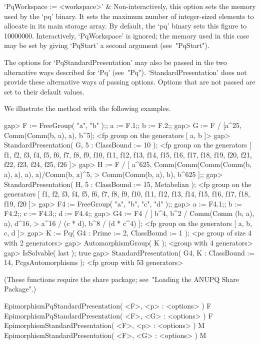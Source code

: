 `PqWorkspace := <workspace>' &
Non-interactively, this option sets the memory used by the  `pq'  binary.
It sets the maximum number of integer-sized elements to allocate  in  its
main storage array. By default, the  `pq'  binary  sets  this  figure  to
10000000. Interactively, `PqWorkspace' is ignored;  the  memory  used  in
this  case  may  be  set  by   giving   `PqStart'   a   second   argument
(see~"PqStart").

\enditems

The options for `PqStandardPresentation' may also be passed  in  the  two
alternative ways described for  `Pq'  (see~"Pq").  `StandardPresentation'
does not provide these alternative ways of passing options. Options  that
are not passed are set to their default values.

We illustrate the method with the following examples.

\beginexample
gap> F := FreeGroup( "a", "b" );; a := F.1;; b := F.2;;
gap> G := F / [a^25, Comm(Comm(b, a), a), b^5];        
<fp group on the generators [ a, b ]>
gap> StandardPresentation( G, 5 : ClassBound := 10 );  
<fp group on the generators [ f1, f2, f3, f4, f5, f6, f7, f8, f9, f10, f11, 
  f12, f13, f14, f15, f16, f17, f18, f19, f20, f21, f22, f23, f24, f25, f26 ]>
gap> H := F / [ a^625, Comm(Comm(Comm(Comm(b, a), a), a), a)/Comm(b, a)^5,
>               Comm(Comm(b, a), b), b^625 ];;                     
gap> StandardPresentation( H, 5 : ClassBound := 15, Metabelian );
<fp group on the generators [ f1, f2, f3, f4, f5, f6, f7, f8, f9, f10, f11, 
  f12, f13, f14, f15, f16, f17, f18, f19, f20 ]>
gap> F4 := FreeGroup( "a", "b", "c", "d" );;                        
gap> a := F4.1;; b := F4.2;; c := F4.3;; d := F4.4;;
gap> G4 := F4 / [ b^4, b^2 / Comm(Comm (b, a), a), d^16,                
>                 a^16 / (c * d), b^8 / (d * c^4) ];
<fp group on the generators [ a, b, c, d ]>
gap> K := Pq( G4 : Prime := 2, ClassBound := 1 );
<pc group of size 4 with 2 generators>
gap> AutomorphismGroup( K );
<group with 4 generators>
gap> IsSolvable( last );
true
gap> StandardPresentation( G4, K : ClassBound := 14, PcgsAutomorphisms );
<fp group with 53 generators>
\endexample

(These functions require the {\ANUPQ}  share  package;  see~"Loading  the
ANUPQ Share Package".)

\>EpimorphismPqStandardPresentation( <F>, <p> : <options> ) F
\>EpimorphismPqStandardPresentation( <F>, <G> : <options> ) F
\>EpimorphismStandardPresentation( <F>, <p> : <options> ) M
\>EpimorphismStandardPresentation( <F>, <G> : <options> ) M

